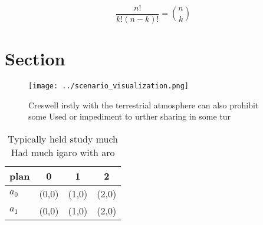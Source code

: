 \documentclass[a4paper]{article}
\begin{document}
\[ \frac{n!}{k!(n-k)!} = \binom{n}{k} \]

\section{Section}

\begin{figure}
\centering
\texttt{[image: ../scenario\_visualization.png]}
\caption{Creswell irstly with the terrestrial atmosphere can also prohibit some Used or impediment to urther sharing in some tur
}
\end{figure}
 
\begin{table}
\begin{adjustbox}{width=0.6\columnwidth}
\begin{tabular}{|l|l|l|l|}
\hline
\textbf{plan} & \multicolumn{1}{c|}{\textbf{0}} & \multicolumn{1}{c|}{\textbf{1}} & \multicolumn{1}{c|}{\textbf{2}} \\ \hline
\textbf{$a_0$}  & (0,0) & (1,0) & (2,0) \\ \hline
\textbf{$a_1$}  & (0,0) & (1,0) & (2,0) \\ \hline
\end{tabular}
\end{adjustbox}
\caption{Typically held study much Had much igaro with aro
}
\end{table}
\end{document}
